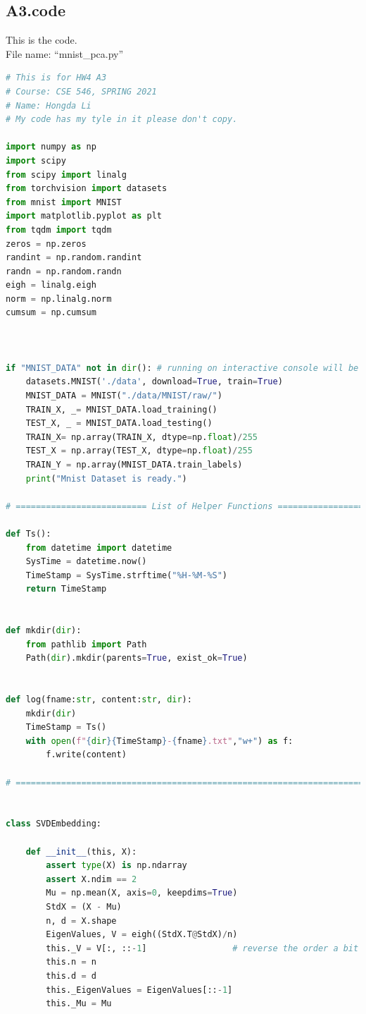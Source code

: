 \documentclass[]{article}
\begin{document}
    \subsection*{A3.code}
        This is the code. 
        \\[1.1em]
        File name: ``mnist\_pca.py'' 
        \begin{lstlisting}[language=python]
# This is for HW4 A3
# Course: CSE 546, SPRING 2021
# Name: Hongda Li
# My code has my tyle in it please don't copy.

import numpy as np
import scipy
from scipy import linalg
from torchvision import datasets
from mnist import MNIST
import matplotlib.pyplot as plt
from tqdm import tqdm
zeros = np.zeros
randint = np.random.randint
randn = np.random.randn
eigh = linalg.eigh
norm = np.linalg.norm
cumsum = np.cumsum



if "MNIST_DATA" not in dir(): # running on interactive console will be faster
    datasets.MNIST('./data', download=True, train=True)
    MNIST_DATA = MNIST("./data/MNIST/raw/")
    TRAIN_X, _= MNIST_DATA.load_training()
    TEST_X, _ = MNIST_DATA.load_testing()
    TRAIN_X= np.array(TRAIN_X, dtype=np.float)/255
    TEST_X = np.array(TEST_X, dtype=np.float)/255
    TRAIN_Y = np.array(MNIST_DATA.train_labels)
    print("Mnist Dataset is ready.")

# ========================== List of Helper Functions ==========================

def Ts():
    from datetime import datetime
    SysTime = datetime.now()
    TimeStamp = SysTime.strftime("%H-%M-%S")
    return TimeStamp


def mkdir(dir):
    from pathlib import Path
    Path(dir).mkdir(parents=True, exist_ok=True)


def log(fname:str, content:str, dir):
    mkdir(dir)
    TimeStamp = Ts()
    with open(f"{dir}{TimeStamp}-{fname}.txt","w+") as f:
        f.write(content)

# ==============================================================================


class SVDEmbedding:

    def __init__(this, X):
        assert type(X) is np.ndarray
        assert X.ndim == 2
        Mu = np.mean(X, axis=0, keepdims=True)
        StdX = (X - Mu)
        n, d = X.shape
        EigenValues, V = eigh((StdX.T@StdX)/n)
        this._V = V[:, ::-1]                 # reverse the order a bit
        this.n = n
        this.d = d
        this._EigenValues = EigenValues[::-1]
        this._Mu = Mu


\end{lstlisting}
\end{document}
